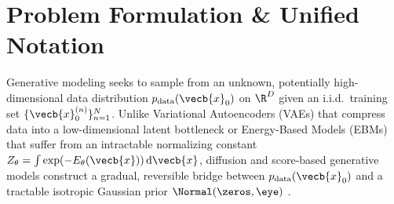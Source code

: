\documentclass[../../../../master.tex]{subfiles}
\begin{document}

\section{Problem Formulation \& Unified Notation}\label{sec:ddpm:formulation}

Generative modeling seeks to sample from an unknown, potentially high-dimensional data distribution $p_{\mathrm{data}}(\vecb{x}_0)$ on $\R^D$ given an i.i.d.\ training set $\{\vecb{x}_0^{(n)}\}_{n=1}^N$. Unlike Variational Autoencoders (VAEs) that compress data into a low-dimensional latent bottleneck or Energy-Based Models (EBMs) that suffer from an intractable normalizing constant $Z_\theta = \int \exp(-E_\theta(\vecb{x}))\,\mathrm{d}\vecb{x}$, diffusion and score-based generative models construct a gradual, reversible bridge between $p_{\mathrm{data}}(\vecb{x}_0)$ and a tractable isotropic Gaussian prior $\Normal(\zeros, \eye)$ .
\end{document}
